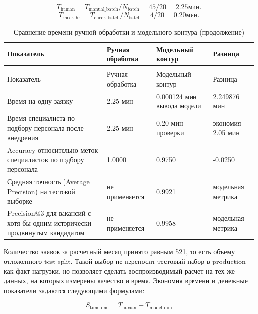 \begin{equation}
\label{eq:t_human-18}
T_{\text{human}} = T_{\text{manual\_batch}} / N_{\text{batch}} = 45 / 20 = 2.25 \text{мин.}
\end{equation}
\begin{equation}
\label{eq:t_check_hr-19}
T_{\text{check\_hr}} = T_{\text{check\_batch}} / N_{\text{batch}} = 4 / 20 = 0.20 \text{мин.}
\end{equation}
\begingroup
\setlength{\tabcolsep}{3pt}
\renewcommand{\arraystretch}{1}
{\linespread{1}\selectfont
\begin{longtable}{|P{0.22\textwidth}|P{0.28\textwidth}|P{0.28\textwidth}|P{0.16\textwidth}|}
\caption{Сравнение времени ручной обработки и модельного контура}\label{tbl:deploy-time}\\*
\hline
Показатель & Ручная обработка & Модельный контур & Разница \\
\hline
\endfirsthead
\caption[]{Сравнение времени ручной обработки и модельного контура (продолжение)}\\*
\hline
Показатель & Ручная обработка & Модельный контур & Разница \\
\hline
\endhead
\hline
\endfoot
\hline
\endlastfoot
Время на одну заявку & 2.25 мин & 0.000124 мин вывода модели & 2.249876 мин \\
\hline
Время специалиста по подбору персонала после внедрения & 2.25 мин & 0.20 мин проверки & экономия 2.05 мин \\
\hline
Accuracy относительно меток специалистов по подбору персонала & 1.0000 & 0.9750 & -0.0250 \\
\hline
Средняя точность (Average Precision) на тестовой выборке & не применяется & 0.9921 & модельная метрика \\
\hline
Precision@3 для вакансий с хотя бы одним исторически продвинутым кандидатом & не применяется & 0.9958 & модельная метрика \\
\end{longtable}
}
\endgroup
Количество заявок за расчетный месяц принято равным 521, то есть объему отложенного test split. Такой выбор не переносит тестовый набор в production как факт нагрузки, но позволяет сделать воспроизводимый расчет на тех же данных, на которых измерены качество и время. Экономия времени и денежные показатели задаются следующими формулами:\par
\begin{equation}
\label{eq:s_time_one-20}
S_{\text{time\_one}} = T_{\text{human}} - T_{\text{model\_min}}
\end{equation}
